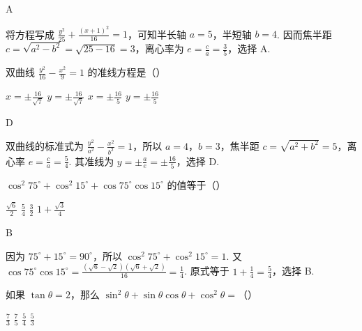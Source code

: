 \documentclass[UTF8,a4paper,oneside,11pt]{ctexbook}
\begin{document}
\begin{answer}
A
\end{answer}

\begin{solution}
将方程写成 \(\frac{y^2}{25}+\frac{(x+1)^2}{16}=1\)，可知半长轴 \(a=5\)，半短轴 \(b=4\). 因而焦半距 \(c=\sqrt{a^2-b^2}=\sqrt{25-16}=3\)，离心率为 \(e=\frac{c}{a}=\frac{3}{5}\)，选择 A.
\end{solution}

\begin{problem}
双曲线 \(\frac{y^2}{16}-\frac{x^2}{9}=1\) 的准线方程是（\quad）

\choices
    {\(x=\pm \frac{16}{\sqrt{7}}\)}
    {\(y=\pm \frac{16}{\sqrt{7}}\)}
    {\(x=\pm \frac{16}{5}\)}
    {\(y=\pm \frac{16}{5}\)}
\end{problem}

\begin{answer}
D
\end{answer}

\begin{solution}
双曲线的标准式为 \(\frac{y^2}{a^2}-\frac{x^2}{b^2}=1\)，所以 \(a=4\)，\(b=3\)，焦半距 \(c=\sqrt{a^2+b^2}=5\)，离心率 \(e=\frac{c}{a}=\frac{5}{4}\). 其准线为 \(y=\pm\frac{a}{e}=\pm\frac{16}{5}\)，选择 D.
\end{solution}

\begin{problem}
\(\cos^2 75^\circ+\cos^2 15^\circ+\cos 75^\circ\cos 15^\circ\) 的值等于（\quad）

\choices
    {\(\frac{\sqrt{6}}{2}\)}
    {\(\frac{5}{4}\)}
    {\(\frac{3}{2}\)}
    {\(1+\frac{\sqrt{3}}{4}\)}
\end{problem}

\begin{answer}
B
\end{answer}

\begin{solution}
因为 \(75^{\circ}+15^{\circ}=90^{\circ}\)，所以 \(\cos^2 75^{\circ}+\cos^2 15^{\circ}=1\). 又
\(\cos75^{\circ}\cos15^{\circ}=\frac{(\sqrt{6}-\sqrt{2})(\sqrt{6}+\sqrt{2})}{16}=\frac{1}{4}\). 原式等于 \(1+\frac14=\frac54\)，选择 B.
\end{solution}

\begin{problem}
如果 \(\tan\theta=2\)，那么 \(\sin^2\theta+\sin\theta\cos\theta+\cos^2\theta=\)（\quad）

\choices
    {\(\frac{7}{3}\)}
    {\(\frac{7}{5}\)}
    {\(\frac{5}{4}\)}
    {\(\frac{5}{3}\)}
\end{problem}
\end{document}
